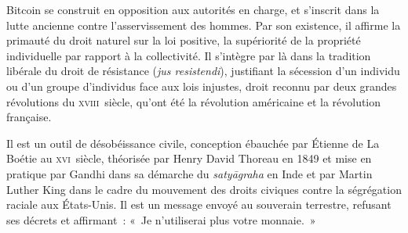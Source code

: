 Bitcoin se construit en opposition aux autorités en charge, et s'inscrit dans la lutte ancienne contre l'asservissement des hommes. Par son existence, il affirme la primauté du droit naturel sur la loi positive, la supériorité de la propriété individuelle par rapport à la collectivité. Il s'intègre par là dans la tradition libérale du droit de résistance (\emph{jus resistendi}), justifiant la sécession d'un individu ou d'un groupe d'individus face aux lois injustes, droit reconnu par deux grandes révolutions du \textsc{xviii}\ieme{}~siècle, qu'ont été la révolution américaine et la révolution française.

Il est un outil de désobéissance civile, conception ébauchée par Étienne de La Boétie au \textsc{xvi}\ieme{}~siècle, théorisée par Henry David Thoreau en 1849 et mise en pratique par Gandhi dans sa démarche du \emph{satyāgraha} en Inde et par Martin Luther King dans le cadre du mouvement des droits civiques contre la ségrégation raciale aux États-Unis. Il est un message envoyé au souverain terrestre, refusant ses décrets et affirmant~: «~Je n'utiliserai plus votre monnaie.~» %


